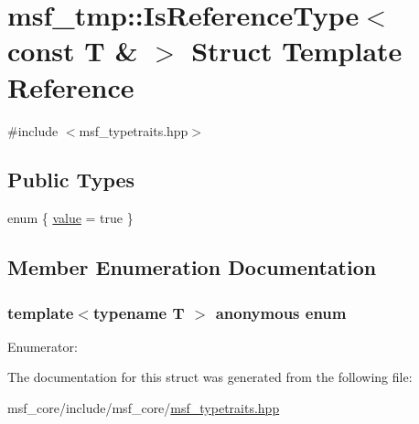 \hypertarget{structmsf__tmp_1_1IsReferenceType_3_01const_01T_01_6_01_4}{\section{msf\-\_\-tmp\-:\-:Is\-Reference\-Type$<$ const T \& $>$ Struct Template Reference}
\label{structmsf__tmp_1_1IsReferenceType_3_01const_01T_01_6_01_4}
}


{\ttfamily \#include $<$msf\-\_\-typetraits.\-hpp$>$}

\subsection*{Public Types}
\begin{DoxyCompactItemize}
\item 
enum \{ \hyperlink{structmsf__tmp_1_1IsReferenceType_3_01const_01T_01_6_01_4_a48a427ad8c026df19b1c66e3f03abd11ad97d1aeec6bdf888707e8b49464a186c}{value} =  true
 \}
\end{DoxyCompactItemize}


\subsection{Member Enumeration Documentation}
\hypertarget{structmsf__tmp_1_1IsReferenceType_3_01const_01T_01_6_01_4_a48a427ad8c026df19b1c66e3f03abd11}{\subsubsection[{anonymous enum}]{\setlength{\rightskip}{0pt plus 5cm}template$<$typename T $>$ anonymous enum}}\label{structmsf__tmp_1_1IsReferenceType_3_01const_01T_01_6_01_4_a48a427ad8c026df19b1c66e3f03abd11}
\begin{Desc}
\item[Enumerator\-: ]\par
\begin{description}
\item[{\em 
\hypertarget{structmsf__tmp_1_1IsReferenceType_3_01const_01T_01_6_01_4_a48a427ad8c026df19b1c66e3f03abd11ad97d1aeec6bdf888707e8b49464a186c}{value}\label{structmsf__tmp_1_1IsReferenceType_3_01const_01T_01_6_01_4_a48a427ad8c026df19b1c66e3f03abd11ad97d1aeec6bdf888707e8b49464a186c}
}]\end{description}
\end{Desc}



The documentation for this struct was generated from the following file\-:\begin{DoxyCompactItemize}
\item 
msf\-\_\-core/include/msf\-\_\-core/\hyperlink{msf__typetraits_8hpp}{msf\-\_\-typetraits.\-hpp}\end{DoxyCompactItemize}

